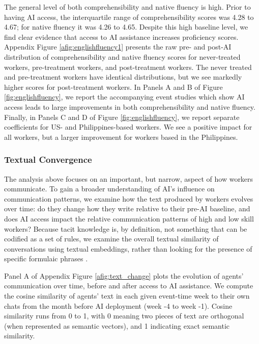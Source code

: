 \documentclass[11pt]{article}
\begin{document}
The general level of both comprehensibility and native fluency is high. Prior to having AI access, the interquartile range of comprehensibility scores was 4.28 to 4.67; for native fluency it was 4.26 to 4.65.  Despite this high baseline level, we find clear evidence that access to AI assistance increases proficiency scores.  Appendix Figure \ref{afig:englishfluency1}  presents the raw pre- and post-AI distribution of comprehensibility and native fluency scores for never-treated workers, pre-treatment workers, and post-treatment workers.  The never treated and pre-treatment workers have identical distributions, but we see markedly higher scores for post-treatment workers.  In Panels A and B of Figure \ref{fig:englishfluency}, we report the accompanying event studies which show AI access leads to large improvements in both comprehensibility and native fluency.  Finally, in Panels C and D of Figure \ref{fig:englishfluency}, we report separate coefficients for US- and Philippines-based workers.  We see a positive impact for all workers, but a larger improvement for workers based in the Philippines. 


\subsubsection{Textual Convergence}

The analysis above focuses on an important, but narrow, aspect of how workers communicate. To gain a broader understanding of AI's influence on communication patterns, we examine how the text produced by workers evolves over time: do they change how they write relative to their pre-AI baseline, and does AI access impact the relative communication patterns of high and low skill workers? Because tacit knowledge is, by definition, not something that can be codified as a set of rules, we examine the overall textual similarity of conversations using textual embeddings, rather than looking for the presence of specific formulaic phrases \citep{sentence2023}.


Panel A of Appendix Figure \ref{afig:text_change} plots the evolution of agents' communication over time, before and after access to AI assistance. We compute the cosine similarity of agents' text in each given event-time week to their own chats from the month before AI deployment (week -4 to week -1). Cosine similarity runs from 0 to 1, with 0 meaning two pieces of text are orthogonal (when represented as semantic vectors), and 1 indicating exact semantic similarity.  
\end{document}
